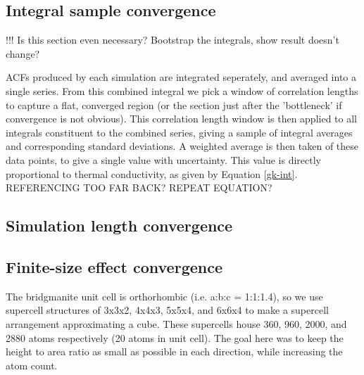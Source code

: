 \subsection{\label{sec:3.GK.int}Integral sample convergence}

!!! Is this section even necessary? Bootstrap the integrals, show result doesn't change?

ACFs produced by each simulation are integrated seperately, and averaged into a single series. 
From this combined integral we pick a window of correlation lengths to capture a flat, converged region (or the section just after the 'bottleneck' if convergence is not obvious). This correlation length window is then applied to all integrals constituent to the combined series, giving a sample of integral averages and corresponding standard deviations. A weighted average is then taken of these data points, to give a single value with uncertainty. This value is directly proportional to thermal conductivity, as given by Equation \ref{gk-int}. REFERENCING TOO FAR BACK? REPEAT EQUATION?

\subsection{\label{sec:3.GK.sim}Simulation length convergence}



\subsection{\label{sec:3.GK.fse}Finite-size effect convergence}

The bridgmanite unit cell is orthorhombic (i.e. a:b:c = 1:1:1.4), so we use supercell structures of 3x3x2, 4x4x3, 5x5x4, and 6x6x4 to make a supercell arrangement approximating a cube. These supercells house 360, 960, 2000, and 2880 atoms respectively (20 atoms in unit cell). The goal here was to keep the height to area ratio as small as possible in each direction, while increasing the atom count.

